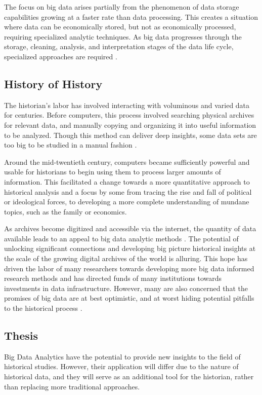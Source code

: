 \documentclass[sigconf]{acmart}
\begin{document}
The focus on big data arises partially from the phenomenon of data storage capabilities growing at a faster rate than data processing. This creates a situation where data can be economically stored, but not as economically processed, requiring specialized analytic techniques. As big data progresses through the storage, cleaning, analysis, and interpretation stages of the data life cycle, specialized approaches are required \cite{bdsurvey}.

\subsection{History of History}

The historian's labor has involved interacting with voluminous and varied data for centuries. Before computers, this process involved searching physical archives for relevant data, and manually copying and organizing it into useful information to be analyzed. Though this method can deliver deep insights, some data sets are too big to be studied in a manual fashion \cite{bdglobalhist}.

Around the mid-twentieth century, computers became sufficiently powerful and usable  for historians to begin using them to process larger amounts of information. This facilitated a change towards a more quantitative approach to historical analysis and a focus by some from tracing the rise and fall of political or ideological forces, to developing a more complete understanding of mundane topics, such as the family or economics.

As archives become digitized and accessible via the internet, the quantity of data available leads to an appeal to big data analytic methods \cite{digitalrepublicletters}. The potential of unlocking significant connections and developing big picture historical insights at the scale of the growing digital archives of the world is alluring. This hope has driven the labor of many researchers towards developing more big data informed research methods and has directed funds of many institutions towards investments in data infrastructure. However, many are also concerned that the promises of big data are at best optimistic, and at worst hiding potential pitfalls to the historical process \cite{bdglobalhist}.

\subsection{Thesis}

Big Data Analytics have the potential to provide new insights to the field of historical studies. However, their application will differ due to the nature of historical data, and they will serve as an additional tool for the historian, rather than replacing more traditional approaches.
\end{document}
